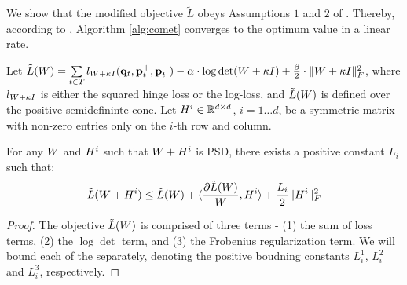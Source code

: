 \documentclass{article}
\begin{document}
{We show that the modified objective $\tilde{L}$ obeys Assumptions $1$ and $2$ of \citet{richtarik2013optimal}. Thereby, according to \citet[Theorem 3]{richtarik2013optimal}, Algorithm \ref{alg:comet} converges to the optimum value in a linear rate.

\begin{lemma}

Let $\tilde{L}({W})=\sum\limits_{t\in T}{l_{{W} + \kappa I}(\mathbf{q}_t, \mathbf{p}_{t}^{+}, \mathbf{p}_{t}^{-})} - \alpha \cdot \log \det({W} + \kappa I) + \tfrac{\beta}{2}  \cdot \| {W} + \kappa I \|_{F}^{2}$, where $l_{{W} + \kappa I}$ is either the squared hinge loss or the log-loss, and $\tilde{L}({W})$ is defined over the positive semidefininte cone. 
Let ${H}^i \in \mathbb{R}^{d \times d}$, $i=1 \ldots d$, be a symmetric matrix with non-zero entries only on the $i$-th row and column.

For any ${W}$ and ${H}^i$ such that ${W} + {H}^i$ is PSD, there exists a positive constant $L_i$ such that:
\begin{equation}
\tilde{L}({W} + {H}^i) \leq \tilde{L}({W}) + \langle \frac{\partial \tilde{L}({W})}{{W}}, {H}^i \rangle + \frac{L_i}{2} \|{H}^i\|_F^2
\end{equation}


\end{lemma}

\begin{proof}

The objective $\tilde{L}({W})$ is comprised of three terms - (1) the sum of loss terms, (2) the $\log \det$ term, and (3) the Frobenius regularization term. We will bound each of the separately, denoting the positive boudning constants $L^1_i$, $L^2_i$ and $L^3_i$, respectively.  %


\end{proof}}
\end{document}
